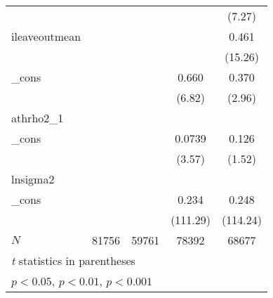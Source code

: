 {\begin{tabular}{l*{4}{c}}
            &                     &                     &                     &      (7.27)         \\
[1em]
ileaveoutmean&                     &                     &                     &       0.461\sym{***}\\
            &                     &                     &                     &     (15.26)         \\
[1em]
\_cons      &                     &                     &       0.660\sym{***}&       0.370\sym{**} \\
            &                     &                     &      (6.82)         &      (2.96)         \\
\hline
athrho2\_1   &                     &                     &                     &                     \\
\_cons      &                     &                     &      0.0739\sym{***}&       0.126         \\
            &                     &                     &      (3.57)         &      (1.52)         \\
\hline
lnsigma2    &                     &                     &                     &                     \\
\_cons      &                     &                     &       0.234\sym{***}&       0.248\sym{***}\\
            &                     &                     &    (111.29)         &    (114.24)         \\
\hline
\(N\)       &       81756         &       59761         &       78392         &       68677         \\
\hline\hline
\multicolumn{5}{l}{\footnotesize \textit{t} statistics in parentheses}\\
\multicolumn{5}{l}{\footnotesize \sym{*} \(p<0.05\), \sym{**} \(p<0.01\), \sym{***} \(p<0.001\)}\\
\end{tabular}
}
